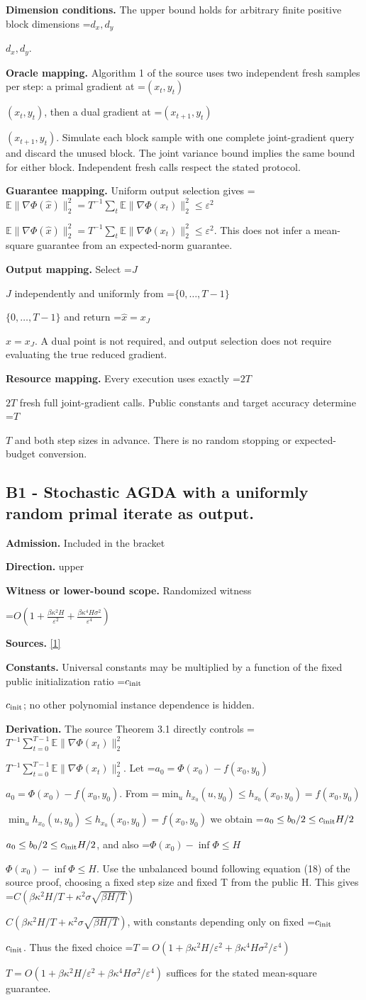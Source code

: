 \documentclass[10pt,a4paper]{article}
\newcommand{\AtlasMath}[1]{\par\begingroup\centering\setbox0=\hbox{$\displaystyle #1$}\ifdim\wd0>1.4\linewidth\typeout{ATLAS WIDE FORMULA: \the\wd0}\fi\ifdim\wd0>\linewidth\resizebox{\linewidth}{!}{\box0}\else\box0\fi\par\endgroup}
\newcommand{\AtlasInlineMath}[1]{\begingroup\setbox0=\hbox{$#1$}\ifdim\wd0>.4\linewidth\endgroup\AtlasMath{#1}\else\endgroup$#1$\fi}
\begin{document}
\textbf{Dimension conditions.} The upper bound holds for arbitrary finite positive block dimensions \AtlasInlineMath{d_x,d_y}.

\textbf{Oracle mapping.} Algorithm 1 of the source uses two independent fresh samples per step: a primal gradient at \AtlasInlineMath{(x_t,y_t)}, then a dual gradient at \AtlasInlineMath{(x_{t+1},y_t)}. Simulate each block sample with one complete joint-gradient query and discard the unused block. The joint variance bound implies the same bound for either block. Independent fresh calls respect the stated protocol.

\textbf{Guarantee mapping.} Uniform output selection gives \AtlasInlineMath{\mathbb E\|\nabla\Phi(\widehat x)\|_2^2=T^{-1}\sum_t\mathbb E\|\nabla\Phi(x_t)\|_2^2\le\varepsilon^2}. This does not infer a mean-square guarantee from an expected-norm guarantee.

\textbf{Output mapping.} Select \AtlasInlineMath{J} independently and uniformly from \AtlasInlineMath{\{0,\ldots,T-1\}} and return \AtlasInlineMath{\widehat x=x_J}. A dual point is not required, and output selection does not require evaluating the true reduced gradient.

\textbf{Resource mapping.} Every execution uses exactly \AtlasInlineMath{2T} fresh full joint-gradient calls. Public constants and target accuracy determine \AtlasInlineMath{T} and both step sizes in advance. There is no random stopping or expected-budget conversion.

\subsection{B1 - Stochastic AGDA with a uniformly random primal iterate as output.}
\textbf{Admission.} Included in the bracket

\textbf{Direction.} upper

\textbf{Witness or lower-bound scope.} Randomized witness

\AtlasMath{O\!\left(1+\frac{\beta\kappa^2 H}{\varepsilon^2}+\frac{\beta\kappa^4 H\sigma^2}{\varepsilon^4}\right)}
\textbf{Sources.} \href{https://proceedings.mlr.press/v151/yang22b/yang22b.pdf}{[1]}

\textbf{Constants.} Universal constants may be multiplied by a function of the fixed public initialization ratio \AtlasInlineMath{c_{\rm init}}; no other polynomial instance dependence is hidden.

\textbf{Derivation.} The source Theorem 3.1 directly controls \AtlasInlineMath{T^{-1}\sum_{t=0}^{T-1}\mathbb E\|\nabla\Phi(x_t)\|_2^2}. Let \AtlasInlineMath{a_0=\Phi(x_0)-f(x_0,y_0)}. From \AtlasInlineMath{\min_u h_{x_0}(u,y_0)\le h_{x_0}(x_0,y_0)=f(x_0,y_0)} we obtain \AtlasInlineMath{a_0\le b_0/2\le c_{\rm init}H/2}, and also \AtlasInlineMath{\Phi(x_0)-\inf\Phi\le H}. Use the unbalanced bound following equation (18) of the source proof, choosing a fixed step size and fixed T from the public H. This gives \AtlasInlineMath{C(\beta\kappa^2H/T+\kappa^2\sigma\sqrt{\beta H/T})}, with constants depending only on fixed \AtlasInlineMath{c_{\rm init}}. Thus the fixed choice \AtlasInlineMath{T=O(1+\beta\kappa^2H/\varepsilon^2+\beta\kappa^4H\sigma^2/\varepsilon^4)} suffices for the stated mean-square guarantee.
\end{document}
